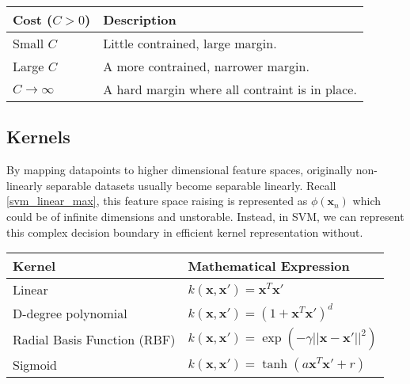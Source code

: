 \documentclass[dissertation.tex]{subfiles}
\begin{document}
\parbox{\linewidth} {
	\centering
  \begin{tabularx}{\textwidth}{|l|X|}
    \hline
    \textbf{Cost ($C > 0 $)}	  & \textbf{Description}
    \\ \hline
    Small $C$ 							    & Little contrained, large margin. 
    \\ \hline
    Large $C$  	                & A more contrained, narrower margin.
		\\ \hline
    $C \rightarrow \infty$      & A hard margin where all contraint is in place.
    \\ \hline

  \end{tabularx}
	\label{tab:c_vals}
}


\subsection{Kernels}
By mapping datapoints to higher dimensional feature spaces, originally non-linearly separable datasets usually become separable linearly. Recall \autoref{svm_linear_max}, this feature space raising is represented as $\phi \left (\mathbf{x}_n \right)$ which could be of infinite dimensions and unstorable. Instead, in SVM, we can represent this complex decision boundary in efficient kernel representation without. 

\parbox{\linewidth} {
  \centering
  \def\arraystretch{1.5}
  \begin{tabularx}{\textwidth}{|X|X|}
    \hline
    \textbf{Kernel}     & \textbf{Mathematical Expression}
    \\ \hline
    Linear              & $k(\mathbf{x},\mathbf{x'}) = \mathbf{x}^T\mathbf{x'}$
    \\ \hline
    D-degree polynomial & $k(\mathbf{x},\mathbf{x'}) = \left(1+\mathbf{x}^T\mathbf{x'}\right)^d$ 
    \\ \hline
    Radial Basis Function (RBF) & $k(\mathbf{x},\mathbf{x'}) = \exp \left( -\gamma ||\mathbf{x}-\mathbf{x'}||^2 \right)$
		\\ \hline
    Sigmoid             & $k(\mathbf{x},\mathbf{x'}) = \tanh \left(a\mathbf{x}^T\mathbf{x'} + r\right)$
    \\ \hline
  \end{tabularx} 
  \label{tab:kernel_vals}
}
\end{document}
